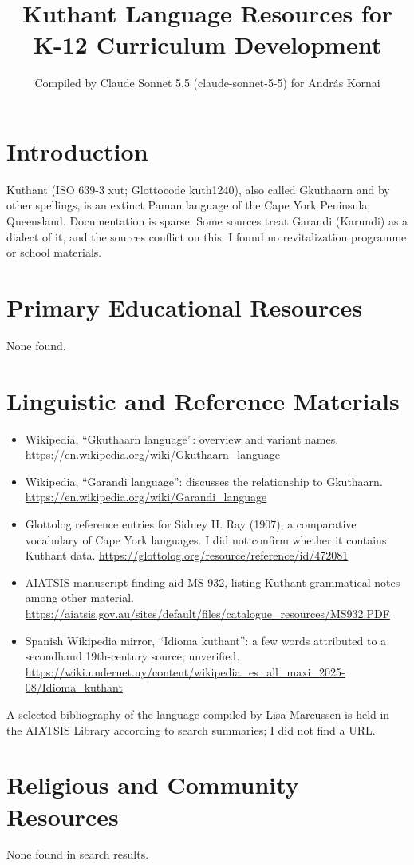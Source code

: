 \documentclass[12pt]{article}
\title{Kuthant Language Resources for K-12 Curriculum Development}
\author{Compiled by Claude Sonnet 5.5 (claude-sonnet-5-5) for Andr\'as Kornai}
\date{}
\begin{document}
\maketitle

\section{Introduction}
Kuthant (ISO 639-3 xut; Glottocode kuth1240), also called Gkuthaarn and by other spellings, is an extinct Paman language of the Cape York Peninsula, Queensland. Documentation is sparse. Some sources treat Garandi (Karundi) as a dialect of it, and the sources conflict on this. I found no revitalization programme or school materials.

\section{Primary Educational Resources}
None found.

\section{Linguistic and Reference Materials}
\begin{itemize}
\item Wikipedia, ``Gkuthaarn language'': overview and variant names. \url{https://en.wikipedia.org/wiki/Gkuthaarn_language}
\item Wikipedia, ``Garandi language'': discusses the relationship to Gkuthaarn. \url{https://en.wikipedia.org/wiki/Garandi_language}
\item Glottolog reference entries for Sidney H. Ray (1907), a comparative vocabulary of Cape York languages. I did not confirm whether it contains Kuthant data. \url{https://glottolog.org/resource/reference/id/472081}
\item AIATSIS manuscript finding aid MS 932, listing Kuthant grammatical notes among other material. \url{https://aiatsis.gov.au/sites/default/files/catalogue_resources/MS932.PDF}
\item Spanish Wikipedia mirror, ``Idioma kuthant'': a few words attributed to a secondhand 19th-century source; unverified. \url{https://wiki.undernet.uy/content/wikipedia_es_all_maxi_2025-08/Idioma_kuthant}
\end{itemize}
A selected bibliography of the language compiled by Lisa Marcussen is held in the AIATSIS Library according to search summaries; I did not find a URL.

\section{Religious and Community Resources}
None found in search results.
\end{document}
